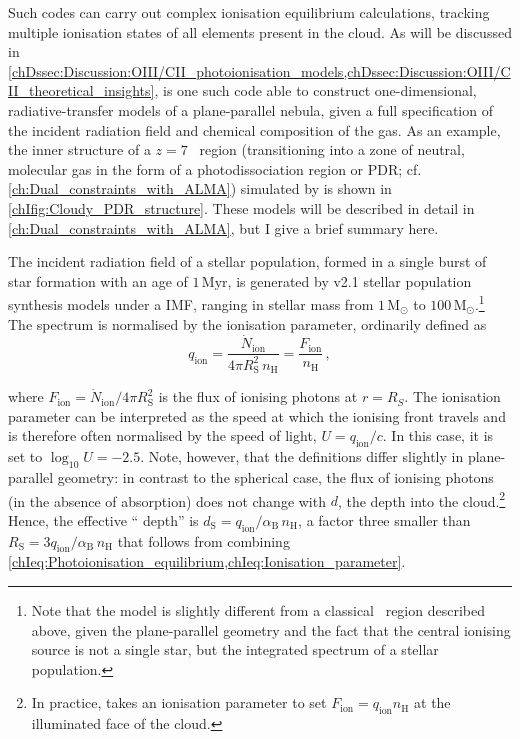 Such codes can carry out complex ionisation equilibrium calculations, tracking multiple ionisation states of all elements present in the cloud. As will be discussed in \cref{chDssec:Discussion:OIII/CII_photoionisation_models,chDssec:Discussion:OIII/CII_theoretical_insights},  \citep[e.g.][]{2017RMxAA..53..385F} is one such code able to construct one-dimensional, radiative-transfer models of a plane-parallel nebula, given a full specification of the incident radiation field and chemical composition of the gas. As an example, the inner structure of a $z = 7$ \HII\ region (transitioning into a zone of neutral, molecular gas in the form of a photodissociation region or PDR; cf. \cref{ch:Dual_constraints_with_ALMA}) simulated by  is shown in \cref{chIfig:Cloudy_PDR_structure}. These models will be described in detail in \cref{ch:Dual_constraints_with_ALMA}, but I give a brief summary here.

The incident radiation field of a stellar population, formed in a single burst of star formation with an age of $1 \, \mathrm{Myr}$, is generated by  v2.1 stellar population synthesis models \citep[including binary stars;][]{2017PASA...34...58E} under a \citeauthor{1955ApJ...121..161S} IMF, ranging in stellar mass from $1 \, \mathrm{M_\odot}$ to $100 \, \mathrm{M_\odot}$.\footnote{Note that the model is slightly different from a classical \HII\ region described above, given the plane-parallel geometry and the fact that the central ionising source is not a single star, but the integrated spectrum of a stellar population.} The spectrum is normalised by the ionisation parameter, ordinarily defined as
\begin{equation}
    \label{chIeq:Ionisation_parameter}
    q_\text{ion} = \frac{\dot{N}_\text{ion}}{4 \pi R_\text{S}^2 \, n_\text{H}} = \frac{F_\text{ion}}{n_\text{H}} \, ,
\end{equation}

\noindent where $F_\text{ion} = \dot{N}_\text{ion} / 4 \pi R_\text{S}^2$ is the flux of ionising photons at $r = R_S$. The ionisation parameter can be interpreted as the speed at which the ionising front travels and is therefore often normalised by the speed of light, $U = q_\text{ion} / c$. In this case, it is set to $\log_{10} U = -2.5$. Note, however, that the definitions differ slightly in plane-parallel geometry: in contrast to the spherical case, the flux of ionising photons (in the absence of absorption) does not change with $d$, the depth into the cloud.\footnote{In practice,  takes an ionisation parameter to set $F_\text{ion} = q_\text{ion} n_\text{H}$ at the illuminated face of the cloud.} Hence, the effective ``\citeauthor{1939ApJ....89..526S} depth'' is $d_\text{S} = q_\text{ion}/\alpha_\text{B} \, n_\text{H}$, a factor three smaller than $R_\text{S} = 3q_\text{ion}/\alpha_\text{B} \, n_\text{H}$ that follows from combining \cref{chIeq:Photoionisation_equilibrium,chIeq:Ionisation_parameter}.

